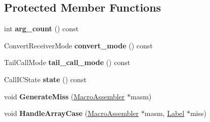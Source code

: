 \subsection*{Protected Member Functions}
\begin{DoxyCompactItemize}
\item 
int {\bfseries arg\+\_\+count} () const \hypertarget{classv8_1_1internal_1_1_call_i_c_stub_a9a128edc28aa0996564f0ada3fb37010}{}\label{classv8_1_1internal_1_1_call_i_c_stub_a9a128edc28aa0996564f0ada3fb37010}

\item 
Convert\+Receiver\+Mode {\bfseries convert\+\_\+mode} () const \hypertarget{classv8_1_1internal_1_1_call_i_c_stub_adc5c64d647e4e2b9b6fbf5c70e96f14a}{}\label{classv8_1_1internal_1_1_call_i_c_stub_adc5c64d647e4e2b9b6fbf5c70e96f14a}

\item 
Tail\+Call\+Mode {\bfseries tail\+\_\+call\+\_\+mode} () const \hypertarget{classv8_1_1internal_1_1_call_i_c_stub_a940fc4cee412b9950e065bd15552e24c}{}\label{classv8_1_1internal_1_1_call_i_c_stub_a940fc4cee412b9950e065bd15552e24c}

\item 
Call\+I\+C\+State {\bfseries state} () const \hypertarget{classv8_1_1internal_1_1_call_i_c_stub_a367c4ded983b13b25a959eef4ab5f2b1}{}\label{classv8_1_1internal_1_1_call_i_c_stub_a367c4ded983b13b25a959eef4ab5f2b1}

\item 
void {\bfseries Generate\+Miss} (\hyperlink{classv8_1_1internal_1_1_macro_assembler}{Macro\+Assembler} $\ast$masm)\hypertarget{classv8_1_1internal_1_1_call_i_c_stub_a7f41ae7f72e80cf6822572ca97ab33b3}{}\label{classv8_1_1internal_1_1_call_i_c_stub_a7f41ae7f72e80cf6822572ca97ab33b3}

\item 
void {\bfseries Handle\+Array\+Case} (\hyperlink{classv8_1_1internal_1_1_macro_assembler}{Macro\+Assembler} $\ast$masm, \hyperlink{classv8_1_1internal_1_1_label}{Label} $\ast$miss)\hypertarget{classv8_1_1internal_1_1_call_i_c_stub_a66b736d48dd536bf118ea753ad613272}{}\label{classv8_1_1internal_1_1_call_i_c_stub_a66b736d48dd536bf118ea753ad613272}

\end{DoxyCompactItemize}
